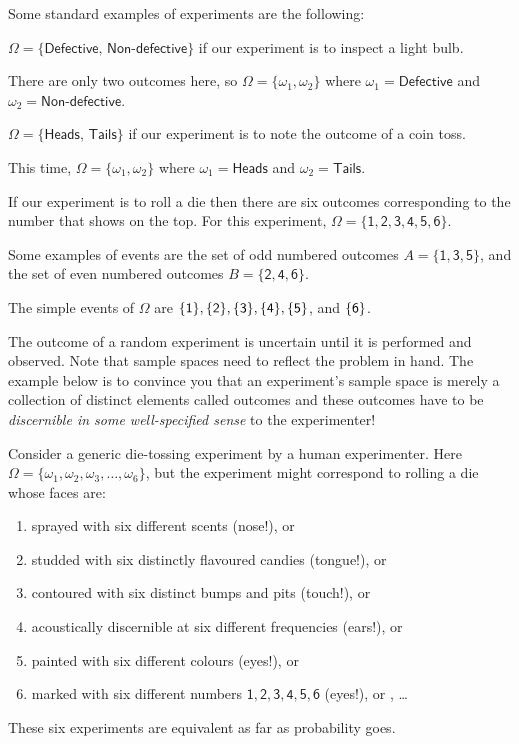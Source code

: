 \begin{example}
Some standard examples of experiments are the following:

\bit

\item $\Omega=\{ {\textsf{Defective, Non-defective}} \}$ if our
  experiment is to inspect a light bulb.

There are only two outcomes here, so   $\Omega = \{ \omega_1, \omega_2\}$
where $\omega_1= {\textsf{Defective}}$ and  $\omega_2 =
{\textsf{Non-defective}}$.


\item $\Omega=\{ {\textsf{Heads, Tails}} \}$ if our experiment is to
  note the outcome of a coin toss.


This time, $\Omega=\{ \omega_1, \omega_2\}$ where $\omega_1= {\textsf{Heads}}$ and  $\omega_2 = {\textsf{Tails}}$.


\item If our experiment is to roll a die  then there are six outcomes corresponding to
  the number that shows on the top. For this experiment,
  $\Omega = \{\mathsf{1,2,3,4,5,6}\}$.


Some examples of events are the set of odd numbered outcomes
$A=\{\mathsf{1,3,5}\}$, and  the set of
even numbered outcomes $B=\{\mathsf{2,4,6}\}$.


The simple events  of $\Omega$ are $\{\sf{1}\}, \{\sf{2}\}, \{\sf{3}\}, \{\sf{4}\}, \{\sf{5}\}$, and $\{\sf{6}\}$.

\eit
\end{example}


The outcome of a random experiment is uncertain until it is performed and observed.  
Note that sample spaces need to reflect the problem in hand.  
The example below is to convince you that an experiment's sample space is merely a collection of distinct elements called outcomes and these outcomes have to be {\em discernible in some well-specified sense} to the experimenter!


\begin{example}
\label{Eg:SensoryDiscerningExperiments} 
Consider a generic
  die-tossing experiment by a human experimenter. Here \newline $\Omega=
  \{\omega_1,\omega_2,\omega_3,\ldots,\omega_6\}$, but the
  experiment might correspond to rolling a die whose faces are:
\begin{enumerate}
\item sprayed with six different scents (nose!), or
\item studded with six distinctly flavoured candies (tongue!), or
\item contoured with six distinct bumps and pits (touch!), or
\item acoustically discernible at six different frequencies (ears!), or
\item painted with six different colours (eyes!), or
\item marked with six different numbers $\mathsf{1,2,3,4,5,6}$ (eyes!), or , \ldots
\end{enumerate}
These six experiments are  equivalent as far as probability goes.
\end{example}


